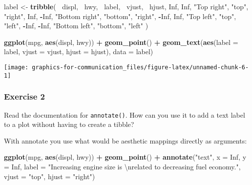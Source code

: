 \documentclass[]{book}
\newenvironment{Shaded}{\begin{snugshade}}{\end{snugshade}}
\newcommand{\CharTok}[1]{\textcolor[rgb]{0.31,0.60,0.02}{#1}}
\newcommand{\DataTypeTok}[1]{\textcolor[rgb]{0.13,0.29,0.53}{#1}}
\newcommand{\KeywordTok}[1]{\textcolor[rgb]{0.13,0.29,0.53}{\textbf{#1}}}
\newcommand{\NormalTok}[1]{#1}
\newcommand{\OperatorTok}[1]{\textcolor[rgb]{0.81,0.36,0.00}{\textbf{#1}}}
\newcommand{\OtherTok}[1]{\textcolor[rgb]{0.56,0.35,0.01}{#1}}
\newcommand{\StringTok}[1]{\textcolor[rgb]{0.31,0.60,0.02}{#1}}
\theoremstyle{plain}
\theoremstyle{remark}
\theoremstyle{definition}
\theoremstyle{definition}
\theoremstyle{definition}
\theoremstyle{remark}
\begin{document}
\begin{Shaded}
\begin{Highlighting}[]
\NormalTok{label <-}\StringTok{ }\KeywordTok{tribble}\NormalTok{(}
  \OperatorTok{~}\NormalTok{displ, }\OperatorTok{~}\NormalTok{hwy, }\OperatorTok{~}\NormalTok{label, }\OperatorTok{~}\NormalTok{vjust, }\OperatorTok{~}\NormalTok{hjust,}
     \OtherTok{Inf}\NormalTok{,  }\OtherTok{Inf}\NormalTok{,    }\StringTok{"Top right"}\NormalTok{, }\StringTok{"top"}\NormalTok{, }\StringTok{"right"}\NormalTok{,}
     \OtherTok{Inf}\NormalTok{, }\OperatorTok{-}\OtherTok{Inf}\NormalTok{,    }\StringTok{"Bottom right"}\NormalTok{, }\StringTok{"bottom"}\NormalTok{, }\StringTok{"right"}\NormalTok{,}
    \OperatorTok{-}\OtherTok{Inf}\NormalTok{,  }\OtherTok{Inf}\NormalTok{,    }\StringTok{"Top left"}\NormalTok{, }\StringTok{"top"}\NormalTok{, }\StringTok{"left"}\NormalTok{,}
    \OperatorTok{-}\OtherTok{Inf}\NormalTok{, }\OperatorTok{-}\OtherTok{Inf}\NormalTok{,    }\StringTok{"Bottom left"}\NormalTok{, }\StringTok{"bottom"}\NormalTok{, }\StringTok{"left"}
\NormalTok{)}

\KeywordTok{ggplot}\NormalTok{(mpg, }\KeywordTok{aes}\NormalTok{(displ, hwy)) }\OperatorTok{+}
\StringTok{  }\KeywordTok{geom_point}\NormalTok{() }\OperatorTok{+}
\StringTok{  }\KeywordTok{geom_text}\NormalTok{(}\KeywordTok{aes}\NormalTok{(}\DataTypeTok{label =}\NormalTok{ label, }\DataTypeTok{vjust =}\NormalTok{ vjust, }\DataTypeTok{hjust =}\NormalTok{ hjust), }\DataTypeTok{data =}\NormalTok{ label)}
\end{Highlighting}
\end{Shaded}

\begin{center}\texttt{[image: graphics-for-communication\_files/figure-latex/unnamed-chunk-6-1]} \end{center}

\hypertarget{exercise-2-71}{%
\subsubsection{Exercise 2}\label{exercise-2-71}}

Read the documentation for \texttt{annotate()}. How can you use it to
add a text label to a plot without having to create a tibble?

With annotate you use what would be aesthetic mappings directly as
arguments:

\begin{Shaded}
\begin{Highlighting}[]
\KeywordTok{ggplot}\NormalTok{(mpg, }\KeywordTok{aes}\NormalTok{(displ, hwy)) }\OperatorTok{+}
\StringTok{  }\KeywordTok{geom_point}\NormalTok{() }\OperatorTok{+}
\StringTok{  }\KeywordTok{annotate}\NormalTok{(}\StringTok{"text"}\NormalTok{, }\DataTypeTok{x =} \OtherTok{Inf}\NormalTok{, }\DataTypeTok{y =} \OtherTok{Inf}\NormalTok{,}
           \DataTypeTok{label =} \StringTok{"Increasing engine size is }\CharTok{\textbackslash{}n}\StringTok{related to decreasing fuel economy."}\NormalTok{, }\DataTypeTok{vjust =} \StringTok{"top"}\NormalTok{, }\DataTypeTok{hjust =} \StringTok{"right"}\NormalTok{)}
\end{Highlighting}
\end{Shaded}
\end{document}
